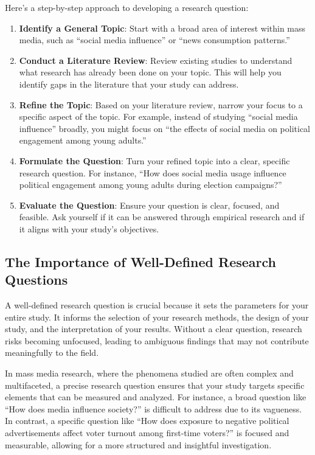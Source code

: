 \documentclass[
]{book}
\begin{document}
Here's a step-by-step approach to developing a research question:

\begin{enumerate}
\def\labelenumi{\arabic{enumi}.}
\item
  \textbf{Identify a General Topic}: Start with a broad area of interest within mass media, such as ``social media influence'' or ``news consumption patterns.''
\item
  \textbf{Conduct a Literature Review}: Review existing studies to understand what research has already been done on your topic. This will help you identify gaps in the literature that your study can address.
\item
  \textbf{Refine the Topic}: Based on your literature review, narrow your focus to a specific aspect of the topic. For example, instead of studying ``social media influence'' broadly, you might focus on ``the effects of social media on political engagement among young adults.''
\item
  \textbf{Formulate the Question}: Turn your refined topic into a clear, specific research question. For instance, ``How does social media usage influence political engagement among young adults during election campaigns?''
\item
  \textbf{Evaluate the Question}: Ensure your question is clear, focused, and feasible. Ask yourself if it can be answered through empirical research and if it aligns with your study's objectives.
\end{enumerate}

\subsection*{The Importance of Well-Defined Research Questions}\label{the-importance-of-well-defined-research-questions}

A well-defined research question is crucial because it sets the parameters for your entire study. It informs the selection of your research methods, the design of your study, and the interpretation of your results. Without a clear question, research risks becoming unfocused, leading to ambiguous findings that may not contribute meaningfully to the field.

In mass media research, where the phenomena studied are often complex and multifaceted, a precise research question ensures that your study targets specific elements that can be measured and analyzed. For instance, a broad question like ``How does media influence society?'' is difficult to address due to its vagueness. In contrast, a specific question like ``How does exposure to negative political advertisements affect voter turnout among first-time voters?'' is focused and measurable, allowing for a more structured and insightful investigation.
\end{document}
